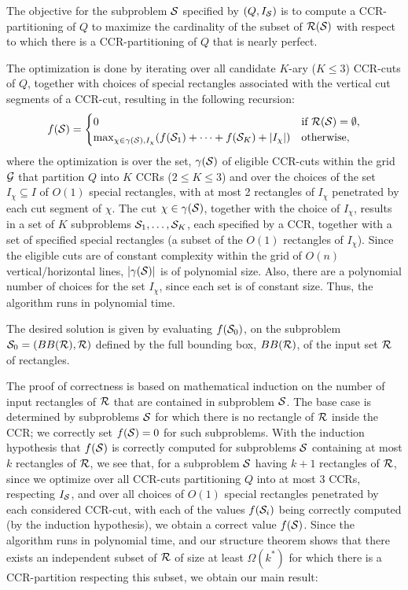 \documentclass{article}
\newcommand{\B}{BB({\cal R})}
\begin{document}
The objective for the subproblem ${\cal S}$ specified by $(Q,I_{\cal S})$
is to compute a CCR-partitioning of $Q$ to maximize the
cardinality of the subset of ${\cal R}({\cal S})$ with respect to
which there is a CCR-partitioning of $Q$ that is nearly perfect.

The optimization is done by iterating over all candidate $K$-ary
($K\leq 3$) CCR-cuts of $Q$, together with choices of special
rectangles associated with the vertical cut segments of a CCR-cut,
resulting in the following recursion:
%
\begin{equation}
  f({\cal S})=\begin{cases}
0 & \mbox{if ${\cal R}({\cal S})=\emptyset$},\\
\max_{\chi\in\gamma({\cal S}), I_\chi} (f({\cal S}_1)+\cdots +f({\cal S}_K) + |I_\chi|) & \mbox{otherwise},
\end{cases}
\end{equation}
%
where the optimization is over the set, $\gamma({\cal S})$ of eligible
CCR-cuts within the grid ${\cal G}$ that partition $Q$ into $K$ CCRs
($2\leq K \leq 3$) and over the choices of the set $I_\chi \subseteq
I$ of $O(1)$ special rectangles, with at most 2 rectangles of $I_\chi$
penetrated by each cut segment of $\chi$.  The cut
$\chi\in \gamma({\cal S})$, together with the choice of $I_\chi$, results in a
set of $K$ subproblems ${\cal S}_1,\ldots,{\cal S}_K$, each specified
by a CCR, together with a set of specified special rectangles (a
subset of the $O(1)$ rectangles of $I_\chi$).  Since the eligible cuts
are of constant complexity within the grid of $O(n)$
vertical/horizontal lines, $|\gamma({\cal S})|$ is of polynomial
size. Also, there are a polynomial number of choices for the set
$I_\chi$, since each set is of constant size.  Thus, the algorithm runs in polynomial time.

The desired solution is given by evaluating $f({\cal S}_0)$, on the
subproblem ${\cal S}_0=(\B,{\cal R})$ defined by the full bounding
box, $\B$, of the input set ${\cal R}$ of rectangles.

The proof of correctness is based on mathematical induction on the
number of input rectangles of ${\cal R}$ that are contained in
subproblem ${\cal S}$. The base case is determined by subproblems
${\cal S}$ for which there is no rectangle of ${\cal R}$ inside the
CCR; we correctly set $f({\cal S})=0$ for such subproblems. With the
induction hypothesis that $f({\cal S})$ is correctly computed for
subproblems ${\cal S}$ containing at most $k$ rectangles of ${\cal
  R}$, we see that, for a subproblem ${\cal S}$ having $k+1$
rectangles of ${\cal R}$, since we optimize over all CCR-cuts
partitioning $Q$ into at most 3 CCRs, respecting $I_{\cal S}$, and
over all choices of $O(1)$ special rectangles penetrated by each
considered CCR-cut, with each of the values $f({\cal S}_i)$ being
correctly computed (by the induction hypothesis), we obtain a correct
value $f({\cal S})$. Since the algorithm runs in polynomial time, and
our structure theorem shows that there exists an independent subset of
${\cal R}$ of size at least $\Omega(k^*)$ %
for which there is a
CCR-partition respecting this subset, we obtain our main result:
\end{document}
